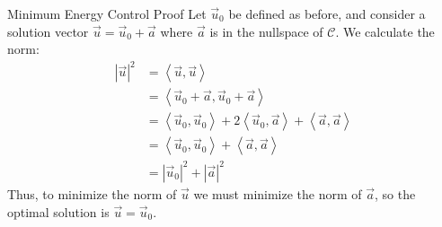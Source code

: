 \begin{frame}{Minimum Energy Control Proof}
	Let $\vec{u}_0$ be defined as before, and consider a solution vector $\vec{u} = \vec{u}_0 + \vec{a}$ where $\vec{a}$ is in the nullspace of $\mathscr{C}$. We calculate the norm:
	\begin{align*}
	\left| \vec{u} \right|^2 
	& = \left< \vec{u}, \vec{u} \right> 
	\\ &= \left< \vec{u}_0 + \vec{a}, \vec{u}_0 + \vec{a} \right> 
	\\ &= \left< \vec{u}_0, \vec{u}_0 \right>  + 2\left< \vec{u}_0, \vec{a} \right>  + \left< \vec{a}, \vec{a} \right> 
	\\ &= \left< \vec{u}_0, \vec{u}_0 \right>  + \left< \vec{a}, \vec{a} \right> 
	\\ &= \left| \vec{u}_0 \right|^2 + \left| \vec{a} \right|^2 
	\end{align*}
	Thus, to minimize the norm of $\vec{u}$ we must minimize the norm of $\vec{a}$, so the optimal solution is $\vec{u} = \vec{u}_0$.
\end{frame}
